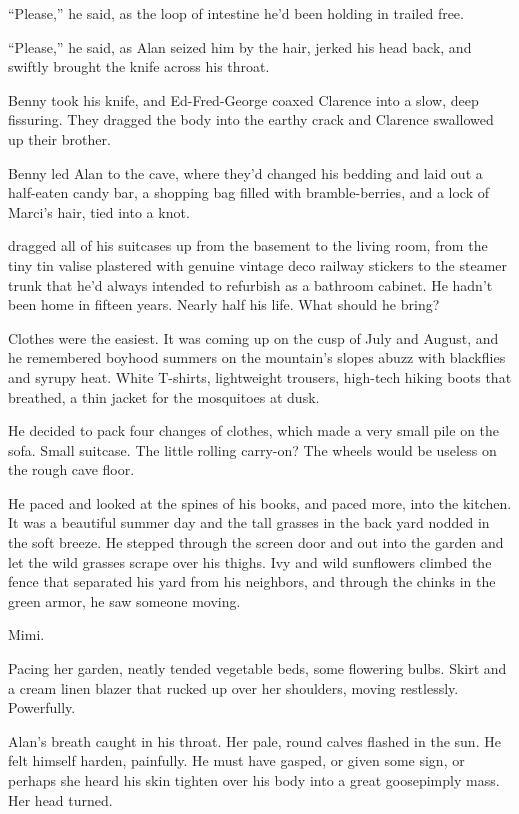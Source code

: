 ``Please,'' he said, as the loop of intestine he'd been holding in
trailed free.

``Please,'' he said, as Alan seized him by the hair, jerked his head
back, and swiftly brought the knife across his throat.

Benny took his knife, and Ed-Fred-George coaxed Clarence into a slow,
deep fissuring.  They dragged the body into the earthy crack and
Clarence swallowed up their brother.

Benny led Alan to the cave, where they'd changed his bedding and laid
out a half-eaten candy bar, a shopping bag filled with
bramble-berries, and a lock of Marci's hair, tied into a knot.

 dragged all of his suitcases up from the basement to the living
room, from the tiny tin valise plastered with genuine vintage deco
railway stickers to the steamer trunk that he'd always intended to
refurbish as a bathroom cabinet.  He hadn't been home in fifteen
years.  Nearly half his life.  What should he bring?

Clothes were the easiest.  It was coming up on the cusp of July and
August, and he remembered boyhood summers on the mountain's slopes
abuzz with blackflies and syrupy heat.  White T-shirts, lightweight
trousers, high-tech hiking boots that breathed, a thin jacket for the
mosquitoes at dusk.

He decided to pack four changes of clothes, which made a very small
pile on the sofa.  Small suitcase.  The little rolling carry-on?  The
wheels would be useless on the rough cave floor.

He paced and looked at the spines of his books, and paced more, into
the kitchen.  It was a beautiful summer day and the tall grasses in
the back yard nodded in the soft breeze.  He stepped through the
screen door and out into the garden and let the wild grasses scrape
over his thighs.  Ivy and wild sunflowers climbed the fence that
separated his yard from his neighbors, and through the chinks in the
green armor, he saw someone moving.

Mimi.

Pacing her garden, neatly tended vegetable beds, some flowering bulbs. 
Skirt and a cream linen blazer that rucked up over her shoulders,
moving restlessly.  Powerfully.

Alan's breath caught in his throat.  Her pale, round calves flashed in
the sun.  He felt himself harden, painfully.  He must have gasped, or
given some sign, or perhaps she heard his skin tighten over his body
into a great goosepimply mass.  Her head turned.

